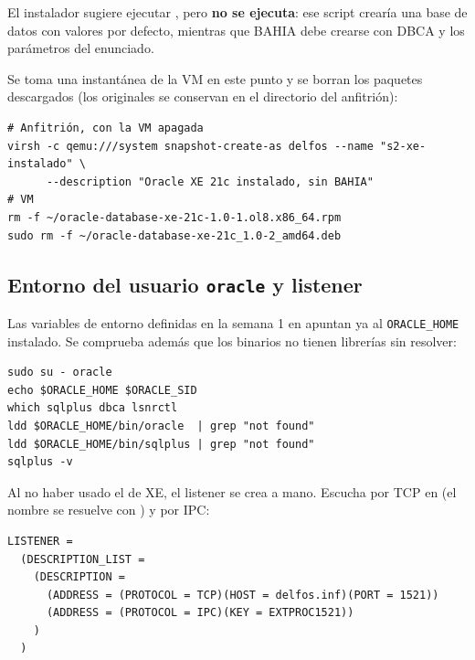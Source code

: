 El instalador sugiere ejecutar , pero
\textbf{no se ejecuta}: ese script crearía una base de datos  con valores
por defecto, mientras que BAHIA debe crearse con DBCA y los parámetros del
enunciado.

Se toma una instantánea de la VM en este punto y se borran los paquetes
descargados (los originales se conservan en el directorio  del
anfitrión):

\begin{lstlisting}[style=bash]
# Anfitrión, con la VM apagada
virsh -c qemu:///system snapshot-create-as delfos --name "s2-xe-instalado" \
      --description "Oracle XE 21c instalado, sin BAHIA"
# VM
rm -f ~/oracle-database-xe-21c-1.0-1.ol8.x86_64.rpm
sudo rm -f ~/oracle-database-xe-21c_1.0-2_amd64.deb
\end{lstlisting}


\subsection{Entorno del usuario \texttt{oracle} y listener}
\label{sec:entorno}

Las variables de entorno definidas en la semana 1 en
 apuntan ya al \texttt{ORACLE\_HOME} instalado.
Se comprueba además que los binarios no tienen librerías sin resolver:

\begin{lstlisting}[style=bash]
sudo su - oracle
echo $ORACLE_HOME $ORACLE_SID
which sqlplus dbca lsnrctl
ldd $ORACLE_HOME/bin/oracle  | grep "not found"
ldd $ORACLE_HOME/bin/sqlplus | grep "not found"
sqlplus -v
\end{lstlisting}


Al no haber usado el  de XE, el listener se crea a mano. Escucha
por TCP en \cmd{delfos.inf:1521} (el nombre se resuelve con \cmd{/etc/hosts}) y
por IPC:

\begin{lstlisting}[style=fichero,caption={\texttt{\$ORACLE\_HOME/network/admin/listener.ora}}]
LISTENER =
  (DESCRIPTION_LIST =
    (DESCRIPTION =
      (ADDRESS = (PROTOCOL = TCP)(HOST = delfos.inf)(PORT = 1521))
      (ADDRESS = (PROTOCOL = IPC)(KEY = EXTPROC1521))
    )
  )
\end{lstlisting}

